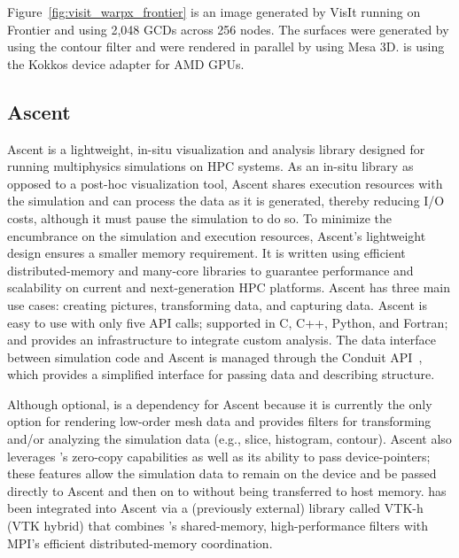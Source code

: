 Figure~\ref{fig:visit_warpx_frontier} is an image generated by VisIt running on Frontier and using 2,048 GCDs across 256 nodes.
The surfaces were generated by using the \vtkm contour filter and were rendered in parallel by using Mesa 3D.
\vtkm is using the Kokkos device adapter for AMD GPUs.

\subsection{Ascent}

Ascent is a lightweight, in-situ visualization and analysis library designed for running multiphysics simulations on HPC systems. As an in-situ library as opposed to a post-hoc visualization tool, Ascent shares execution resources with the simulation and can process the data as it is generated, thereby reducing I/O costs, although it must pause the simulation to do so. To minimize the encumbrance on the simulation and execution resources, Ascent's lightweight design ensures a smaller memory requirement. It is written using efficient distributed-memory and many-core libraries to guarantee performance and scalability on current and next-generation HPC platforms. Ascent has three main use cases: creating pictures, transforming data, and capturing data. Ascent is easy to use with only five API calls; supported in C, C++, Python, and Fortran; and provides an infrastructure to integrate custom analysis.
The data interface between simulation code and Ascent is managed through the Conduit API~\citep{Harrison2022}, which provides a simplified interface for passing data and describing structure.

Although optional, \vtkm is a dependency for Ascent because it is currently the only option for rendering low-order mesh data and provides filters for transforming and/or analyzing the simulation data (e.g.,
slice, histogram, contour).
Ascent also leverages \vtkm's zero-copy capabilities as well as its ability to pass device-pointers; these features allow the simulation data to remain on the device and be passed directly to Ascent and then on to \vtkm without being transferred to host memory.
\vtkm has been integrated into Ascent via a (previously external) library called VTK-h (VTK hybrid) that combines \vtkm's shared-memory, high-performance filters with MPI's efficient distributed-memory coordination.

